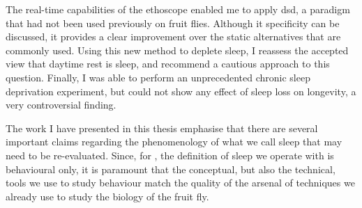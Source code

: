 The real-time capabilities of the ethoscope enabled me to apply \acrfull{dsd}, a paradigm that had not been used previously on fruit flies. 
Although it specificity can be discussed, it provides a clear improvement over the static alternatives that are commonly used.
Using this new method to deplete sleep, I reassess the accepted view that daytime rest is sleep, and recommend a cautious approach to this question.
Finally, I was able to perform an unprecedented chronic sleep deprivation experiment, 
but could not show any effect of sleep loss on longevity, a very controversial finding. 

The work I have presented in this thesis emphasise that there are several important claims
regarding the phenomenology of what we call sleep that may need to be re-evaluated.
Since, for \droso, the definition of sleep  we operate with is behavioural only, 
it is paramount that the conceptual, but also the technical, tools we use to study behaviour
match the quality of the arsenal of techniques we already use to study the biology of the fruit fly.


%
%
%
%
%
%
%
%
%


%
%
%
%
%
%
